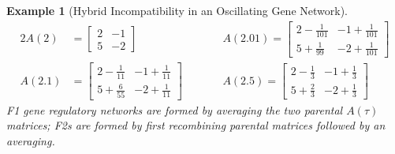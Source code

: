 \documentclass{article}
\newcommand{\1}{\mathbbm{1}}
\newtheorem{example}{Example}
\begin{document}
\begin{example}[Hybrid Incompatibility in an Oscillating Gene Network]
        \begin{alignat*}{2}
          A(2) &= \left[\begin{array}{cc} 2 & -1 \\[6pt] 5 & -2 \end{array}\right] &&\qquad A(2.01) = \left[\begin{array}{cc} 2 -\frac{1}{101} & -1 + \frac{1}{101} \\[6pt] 5 + \frac{1}{99} & -2 + \frac{1}{101} \end{array}\right] \\
            A(2.1) &= \left[\begin{array}{cc} 2 - \frac{1}{11} & -1 + \frac{1}{11} \\[6pt] 5 + \frac{6}{55} & -2 + \frac{1}{11} \end{array}\right] &&\qquad A(2.5) = \left[\begin{array}{cc} 2 - \frac{1}{3} & -1 + \frac{1}{3} \\[6pt] 5 + \frac{2}{3} & -2 + \frac{1}{3} \end{array}\right]
        \end{alignat*}
        F1 gene regulatory networks are formed by averaging the two parental $A(\tau)$ matrices; F2s are formed by first recombining parental matrices followed by an averaging. 


\end{example}
\end{document}
